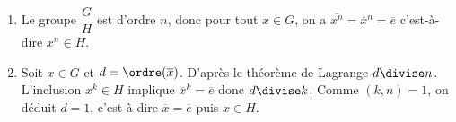\mbox{}
\begin{enumerate}
  \item 
    Le groupe $\dfrac{G}{H}$ est d'ordre $n$, donc pour tout $x\in G$, on a
    $\overline{x^n}=\overline{x}^n=\overline{e}$ c'est-à-dire $x^n\in H$.
  \item 
    Soit $x\in G$ et $d=\ordre(\overline{x})$. D'après le théorème de Lagrange
    $d\divise n$. L'inclusion $x^k\in H$ implique $\overline{x}^k=\overline{e}$
    donc $d\divise k$. Comme $(k,n)=1$, on déduit $d=1$, c'est-à-dire
    $\overline{x}=\overline{e}$ puis $x\in H$.
\end{enumerate}
